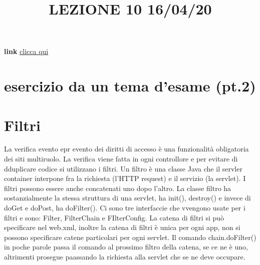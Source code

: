 \title{LEZIONE 10 16/04/20}
\textbf{link} \href{https://web.microsoftstream.com/video/23680e25-5ca6-48fc-aeb4-4cdbbee98726?list=user&userId=cfe0965d-9a7c-40e2-be6e-f078296a1914}{clicca qui}
\section{esercizio da un tema d'esame (pt.2)}
\section{Filtri}
La verifica evento epr evento dei diritti di accesso è una funzionalità obligatoria dei siti multiruolo.\newline
La verifica viene fatta in ogni controllore e per evitare di dduplicare codice si utilizzano i filtri.\newline
Un filtro è una classe Java che il servler container interpone fra la richiesta (l'HTTP request) e il servizio (la servlet). I filtri possono essere anche concatenati uno dopo l'altro.\newline
\newline
La classe filtro ha sostanzialmente la stessa struttura di una servlet, ha init(), destroy() e invece di doGet e doPost, ha doFilter(). Ci sono tre interfaccie che vvengono usate per i filtri e sono: Filter, FilterChain e FIlterConfig.\newline
\newline
La catena di filtri si può specificare nel web.xml, inoltre la catena di filtri è unica per ogni app, non si possono specificare catene particolari per ogni servlet. Il comando chain.doFilter() in poche parole passa il comando al prossimo filtro della catena, se ce ne è uno, altrimenti prosegue paassando la richiesta alla servlet che se ne deve occupare.\newline
\newline


